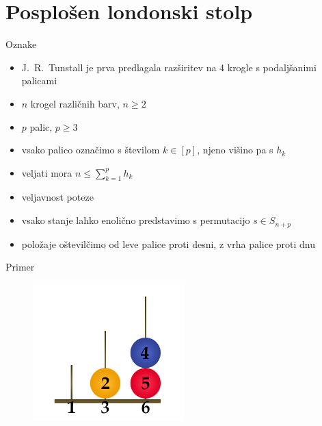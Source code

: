 \documentclass[dvipsnames]{beamer}
\begin{document}

\section{Posplošen londonski stolp}
\begin{frame}{Oznake}
    \begin{itemize}
        \item J.\ R.\ Tunstall je prva predlagala razširitev na 4 krogle s podaljšanimi palicami
        \item $n$ krogel različnih barv, $n \geq 2$
        \item $p$ palic, $p \geq 3$
        \item vsako palico označimo s številom $k \in [p]$, njeno višino pa s $h_k$
        \item veljati mora $n \leq \sum_{k=1}^p h_k$
        \item veljavnost poteze
        \item vsako stanje lahko enolično predstavimo s permutacijo $s \in S_{n+p}$
        \item položaje oštevilčimo od leve palice proti desni, z vrha palice proti dnu
    \end{itemize}
\end{frame}

\begin{frame}{Primer}
    \begin{figure}
        \centering
        \includegraphics[height=150pt]{../img/london-tower-numbered.png}
    \end{figure}
\end{frame}
\end{document}
